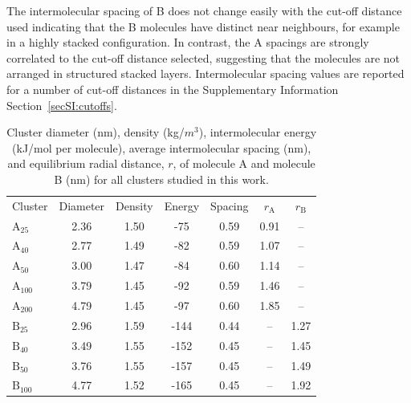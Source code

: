 The intermolecular spacing of B does not change easily with the cut-off distance used indicating that the B molecules have distinct near neighbours, for example in a highly stacked configuration. In contrast, the A spacings are strongly correlated to the cut-off distance selected, suggesting that the molecules are not arranged in structured stacked layers. Intermolecular spacing values are reported for a number of cut-off distances in the Supplementary Information Section~\ref{secSI:cutoffs}.
%
\begin{table}[ht]
\centering
\caption{Cluster diameter (nm), density (kg/$m^3$), intermolecular energy (kJ/mol per molecule), average intermolecular spacing (nm), and equilibrium radial distance, $r$, of molecule A and molecule B (nm) for all clusters studied in this work.} %
\label{table:maintable}
\begin{tabular}{lcccccc}
\hline
\multicolumn{1}{l}{\multirow{2}{*}{Cluster}} & \multicolumn{1}{c}{\multirow{2}{*}{Diameter}} & \multicolumn{1}{c}{\multirow{2}{*}{Density}} & \multicolumn{1}{c}{\multirow{2}{*}{Energy}} & \multicolumn{1}{c}{\multirow{2}{*}{Spacing}} & \multicolumn{1}{c}{\multirow{2}{*}{$r_{\text{A}}$}} & 
\multicolumn{1}{c}{\multirow{2}{*}{$r_{\text{B}}$}} \\ 
\multicolumn{1}{c}{} & \multicolumn{1}{c}{} & \multicolumn{1}{c}{} & \multicolumn{1}{c}{} & \multicolumn{1}{c}{} & \multicolumn{1}{c}{} & \multicolumn{1}{c}{} \\ \hline
$\text{A}_{\text{25}}$ & 2.36 & 1.50 & -75 & 0.59 &  0.91 & -- \\
$\text{A}_{\text{40}}$ & 2.77 & 1.49 & -82 & 0.59 & 1.07 & -- \\
$\text{A}_{\text{50}}$ & 3.00 & 1.47 & -84 & 0.60 & 1.14 & -- \\
$\text{A}_{\text{100}}$ & 3.79 & 1.45 & -92 & 0.59 & 1.46 & -- \\
$\text{A}_{\text{200}}$ & 4.79 & 1.45 & -97 & 0.60 & 1.85 & -- \\ \hline
$\text{B}_{\text{25}}$ & 2.96 & 1.59 & -144 & 0.44 & -- & 1.27 \\
$\text{B}_{\text{40}}$ & 3.49 & 1.55 & -152 & 0.45 & -- & 1.45 \\
$\text{B}_{\text{50}}$ & 3.76 & 1.55 & -157 & 0.45 & -- & 1.49 \\
$\text{B}_{\text{100}}$ & 4.77 & 1.52 & -165 & 0.45 & -- & 1.92 \\ \hline

\end{tabular}
\end{table}
